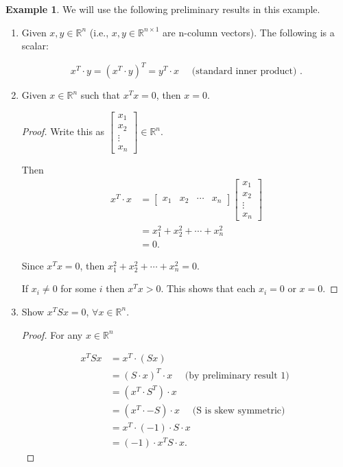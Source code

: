 \documentclass[12pt]{article}
\theoremstyle{definition}
\newtheorem*{example}{Example}
\begin{document}
\begin{example}
We will use the following preliminary results in this example.

\begin{enumerate}[label = (\arabic*)]
\item  Given $x, y \in \mathbb{R}^n$ (i.e., $x, y \in \mathbb{R}^{n \times 1}$ are n-column vectors).
The following is a scalar:

\[
x^T \cdot y = (x^T \cdot y)^T = y^T \cdot x \quad \text{ (standard inner product) }.
\]



\item Given $x \in \mathbb{R}^n$ such that $x^T x = 0$, then $x = 0$.

\begin{proof}
Write this as 
$\displaystyle
\begin{bmatrix}
x_1 \\ x_2 \\ \vdots \\ x_n
\end{bmatrix}
\in \mathbb{R}^n.
$

Then
\begin{align*}
x^T \cdot x &= 
\begin{bmatrix}
x_1 & x_2 & \cdots & x_n
\end{bmatrix}
\begin{bmatrix}
x_1 \\
x_2 \\
\vdots \\
x_n
\end{bmatrix} \\
&=
x_1^2 + x_2^2 + \cdots + x_n^2 \\
&= 0.
\end{align*}

Since $x^Tx = 0$, then $x_1^2 + x_2^2 + \cdots + x^2_n = 0$.

If $x_i \neq 0$ for some $i$ then $x^Tx > 0$. This shows that each $x_i = 0$ or $x = 0$.
\end{proof}

\item Show $x^T S x = 0$, $\forall x \in \mathbb{R}^n$.
\begin{proof}
For any $x \in \mathbb{R}^n$

\begin{align*}
x^TSx &= x^T \cdot (Sx) \\
&= (S \cdot x)^T \cdot x \quad \text{ (by preliminary result 1) }\\
&= (x^T \cdot S^T) \cdot x \\
&= (x^T \cdot -S) \cdot x \quad \text{ (S is skew symmetric) }\\
&= x^T \cdot (-1)\cdot S \cdot x \\
&= (-1) \cdot x^TS \cdot x.
\end{align*}


\end{proof}
\end{enumerate}
\end{example}
\end{document}
